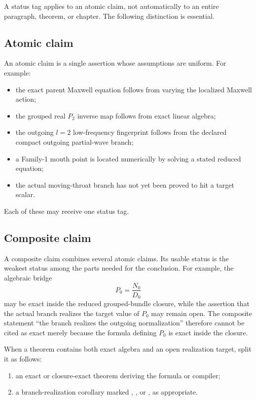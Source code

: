 A status tag applies to an atomic claim, not automatically to an entire paragraph, theorem, or chapter.  The following distinction is essential.

\subsection{Atomic claim}
\label{subsec:atomic-claim}

An atomic claim is a single assertion whose assumptions are uniform.  For example:
\begin{itemize}[leftmargin=2.2em]
  \item the exact parent Maxwell equation follows from varying the localized Maxwell action;
  \item the grouped real \(P_2\) inverse map follows from exact linear algebra;
  \item the outgoing \(l=2\) low-frequency fingerprint follows from the declared compact outgoing partial-wave branch;
  \item a Family-1 mouth point is located numerically by solving a stated reduced equation;
  \item the actual moving-throat branch has not yet been proved to hit a target scalar.
\end{itemize}
Each of these may receive one status tag.

\subsection{Composite claim}
\label{subsec:composite-claim}

A composite claim combines several atomic claims.  Its usable status is the weakest status among the parts needed for the conclusion.  For example, the algebraic bridge
\[
P_0=\frac{N_0}{D_0}
\]
may be exact inside the reduced grouped-bundle closure, while the assertion that the actual branch realizes the target value of \(P_0\) may remain open.  The composite statement ``the branch realizes the outgoing normalization'' therefore cannot be cited as exact merely because the formula defining \(P_0\) is exact inside the closure.

When a theorem contains both exact algebra and an open realization target, split it as follows:
\begin{enumerate}[leftmargin=2.2em]
  \item an exact or closure-exact theorem deriving the formula or compiler;
  \item a branch-realization corollary marked \StatusOpen, \StatusNumerical, or \StatusReduced, as appropriate.
\end{enumerate}

